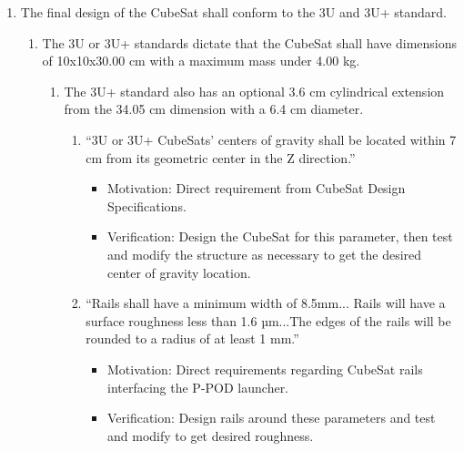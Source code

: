 \begin{enumerate} %
    \item The final design of the CubeSat shall conform to the 3U and 3U+ standard.
    \begin{enumerate}
        \item The 3U or 3U+ standards dictate that the CubeSat shall have dimensions of 10x10x30.00 cm with a maximum mass under 4.00 kg.
        \begin{enumerate}
            \item The 3U+ standard also has an optional 3.6 cm cylindrical extension from the 34.05 cm dimension with a 6.4 cm diameter.  
            \begin{enumerate}
                \item “3U or 3U+ CubeSats’ centers of gravity shall be located within 7 cm from its geometric center in the Z direction.” \cite{CSS} 
                \begin{itemize}
                    \item Motivation: Direct requirement from CubeSat Design Specifications. 
                    \item Verification: Design the CubeSat for this parameter, then test and modify the structure as necessary to get the desired center of gravity location. 
                \end{itemize}
                \item “Rails shall have a minimum width of 8.5mm... Rails will have a surface roughness less than 1.6 µm...The edges of the rails will be rounded to a radius of at least 1 mm.” \cite{CSS} 
                \begin{itemize}
                    \item Motivation: Direct requirements regarding CubeSat rails interfacing the P-POD launcher.  
                    \item Verification: Design rails around these parameters and test and modify to get desired roughness. 
                \end{itemize}
            \end{enumerate}
        \end{enumerate}


\end{enumerate}
\end{enumerate}
